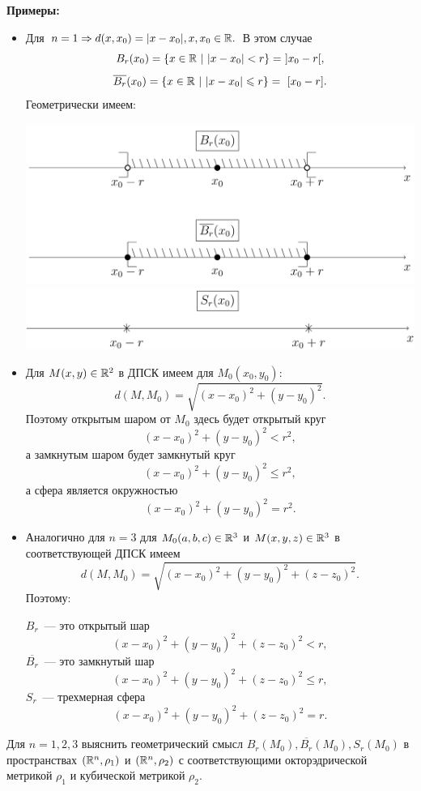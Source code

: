 \documentclass[../../main.tex]{subfiles}
\begin{document}
  \smallskip
  \textbf{Примеры:}
  \begin{itemize}
  \item Для $n = 1 \Rightarrow d(x, x_0) = |x - x_0|, x, x_0 \in \mathbb{R}.
  $ В этом случае 
  \[
    B_r(x_0) = \{x \in \mathbb{R}\ |\ |x - x_0| < r\} =\ ] x_0 - r [,
  \]
  \[
    \overline{B_r}(x_0) = \{x \in \R\ |\ |x - x_0| \leqslant r\} =\ 
    [ x_0 - r ].
  \]
  Геометрически имеем:
  
  \includegraphics[width=\linewidth]{2019-02-15_17-21-02.png}
  \includegraphics[width=\linewidth]{2019-02-15_17-21-17.png}
  
  \item  Для $M(x, y) \in \mathbb{R}^2$ в ДПСК имеем для $M_0(x_0, y_0)$:
  \[
    d(M, M_0) = \sqrt{(x - x_0)^2 + (y - y_0)^2}.
  \]
  Поэтому открытым шаром от $M_0$ здесь будет открытый круг 
  \[
    (x - x_0)^2 + (y - y_0)^2 < r^2,
  \]
  а замкнутым шаром будет замкнутый круг 
  \[
    (x - x_0)^2 + (y - y_0)^2 \leqslant r^2,
  \]
  а сфера является окружностью 
  \[
    (x - x_0)^2 + (y - y_0)^2 = r^2.
  \]
  
  \item Аналогично для $n = 3$ для $M_0(a, b, c) \in \mathbb{R}^3$ и $M(x, 
  y, z) \in \mathbb{R}^3$ в соответствующей ДПСК имеем  
  \[
    d(M, M_0) = \sqrt{(x - x_0)^2 + (y - y_0)^2 + (z - z_0)^2}.
  \]
  Поэтому:
  
  $B_r$~--- это открытый шар
  \[
    (x - x_0)^2 + (y - y_0)^2 + (z - z_0)^2 < r,
  \]
  $\overline{B_r}$~--- это замкнутый шар
  \[
  (x - x_0)^2 + (y - y_0)^2 + (z - z_0)^2 \leqslant r,
  \]  
  $S_r$~--- трехмерная сфера
  \[
  (x - x_0)^2 + (y - y_0)^2 + (z - z_0)^2 = r.
  \]
  \end{itemize}
  \begin{exc}
    Для $n = 1, 2, 3$  выяснить геометрический смысл $B_r(M_0), 
    \overline{B_r}(M_0),  S_r(M_0)$ в пространствах $(\mathbb{R}^n, \rho_1)$ 
    и $(\mathbb{R}^n, \rho_2)$  с соответствующими окторэдрической метрикой 
    $\rho_1$ и кубической метрикой $\rho_2$. 
  \end{exc}
\end{document}
